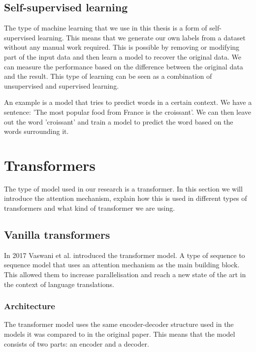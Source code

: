 \subsection{Self-supervised learning}

The type of machine learning that we use in this thesis is a form of self-supervised learning\cite{doersch_multi-task_2017}. This means that we generate our own labels from a dataset without any manual work required. This is possible by removing or modifying part of the input data and then learn a model to recover the original data. We can measure the performance based on the difference between the original data and the result. This type of learning can be seen as a combination of unsupervised and supervised learning.

An example is a model that tries to predict words in a certain context. We have a sentence: 'The most popular food from France is the croissant'. We can then leave out the word 'croissant' and train a model to predict the word based on the words surrounding it.


\section{Transformers}
\label{sec:transformers}

The type of model used in our research is a transformer. In this section we will introduce the attention mechanism, explain how this is used in different types of transformers and what kind of transformer we are using.

\subsection{Vanilla transformers}

In 2017 Vaswani et al.\cite{vaswani_attention_2017} introduced the transformer model. A type of sequence to sequence model that uses an attention mechanism as the main building block. This allowed them to increase parallelisation and reach a new state of the art in the context of language translations.

\subsubsection{Architecture}

The transformer model uses the same encoder-decoder structure used in the models it was compared to in the original paper\cite{bahdanau_neural_2016, cho_learning_2014}. This means that the model consists of two parts: an encoder and a decoder.

